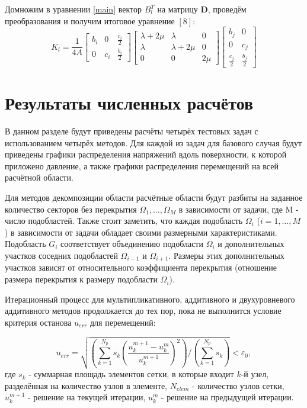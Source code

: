 \documentclass[a4paper]{article}
\begin{document}
Домножим в уравнении \ref{main} вектор $B_l^T$ на матрицу $\mathbf{D}$, проведём преобразования и получим итоговое уравнение $\left[8\right]$:
\begin{equation}
K_l = \frac{1}{4A}
\begin{bmatrix}
b_i & 0 & \frac{c_i}{2}\\ 
0 & c_i & \frac{b_i}{2}
\end{bmatrix}
\begin{bmatrix}
\lambda + 2\mu & \lambda & 0 \\ 
\lambda & \lambda + 2\mu & 0 \\ 
0 & 0 & 2\mu 
\end{bmatrix}
\begin{bmatrix}
b_j & 0 \\
0 & c_j \\
\frac{c_j}{2} & \frac{b_j}{2}
\end{bmatrix}
\end{equation}

\newpage

\section{Результаты численных расчётов}

В данном разделе будут приведены расчёты четырёх тестовых задач с использованием четырёх методов. Для каждой из задач для базового случая будут приведены графики распределения напряжений вдоль поверхности, к которой приложено давление, а также графики распределения перемещений на всей расчётной области.

Для методов декомпозиции области расчётные области будут разбиты на заданное количество секторов без перекрытия $\Omega_1, \ldots, \Omega_M$ в зависимости от задачи, где M - число подобластей. Также стоит заметить, что каждая подобласть $\Omega_i$ ($i = 1,\ldots,M$) в зависимости от задачи обладает своими размерными характеристиками. Подобласть $G_i$ соответствует объединению подобласти $\Omega_i$ и дополнительных участков соседних подобластей $\Omega_{i-1}$ и $\Omega_{i+1}$. Размеры этих дополнительных участков зависят от относительного коэффициента перекрытия (отношение размера перекрытия к размеру подобласти $\Omega_i$).

Итерационный процесс для мультипликативного, аддитивного и двухуровневого аддитивного методов продолжается до тех пор, пока не выполнится условие критерия останова $u_{err}$ для перемещений:

\begin{equation*}
u_{err} = \sqrt{\left(\sum_{k = 1}^{N_p} s_k \left(\frac{u_{k}^{m+1} - u_{k}^{m}}{u_{k}^{m+1}} \right)^2\right) / \left(\sum_{k = 1}^{N_{p}} s_k\right)} < \varepsilon_0,
\end{equation*}
где $s_k$ - суммарная площадь элементов сетки, в которые входит $k$-й узел, разделённая на количество узлов в элементе, $N_{elem}$ - количество узлов сетки, $u_{k}^{m+1}$ - решение на текущей итерации, $u_{k}^{m}$ - решение на предыдущей итерации.
\end{document}
